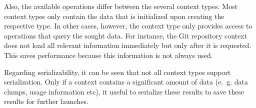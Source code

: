 Also, the available operations differ between  the several context types. Most context types only contain the data that is initialized upon creating the respective type. In other cases, however, the context type only provides access to operations that query the sought data. For instance, the Git repository context does not load all relevant information immediately but only after it is requested. This saves performance because this information is not always used. 

Regarding serializability, it can be seen that not all context types support serialization. Only if a context contains a significant amount of data (e.~g. data clumps, usage information etc), it useful to serialize these results to save these results for further launches. 
